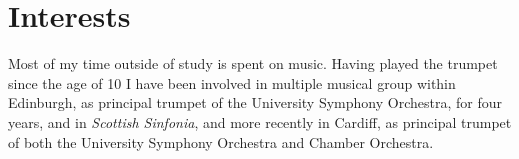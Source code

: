 \section{Interests}
Most of my time outside of study is spent on music. Having played
the trumpet since the age of 10 I have been involved
in multiple musical group within Edinburgh, as principal trumpet of the University Symphony Orchestra, for four years, and in \textit{Scottish Sinfonia}, and more recently in Cardiff, as principal trumpet of both the University Symphony Orchestra and Chamber Orchestra.
